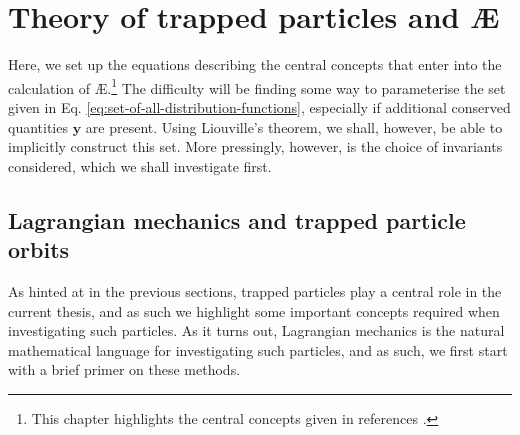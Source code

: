 \chapter[Theory]{Theory of trapped particles and \AE{}}
\label{chap: chapter 2}
Here, we set up the equations describing the central concepts that enter into the calculation of \AE{}.\footnote{This chapter highlights the central concepts given in references \cite{helander2005collisional,helander2014theory,helander2017available,helander2020available}.} The difficulty will be finding some way to parameterise the set given in Eq. \eqref{eq:set-of-all-distribution-functions}, especially if additional conserved quantities $\boldsymbol{y}$ are present. Using Liouville's theorem, we shall, however, be able to implicitly construct this set. More pressingly, however, is the choice of invariants considered, which we shall investigate first.


\section{Lagrangian mechanics and trapped particle orbits}
As hinted at in the previous sections, trapped particles play a central role in the current thesis, and as such we highlight some important concepts required when investigating such particles. As it turns out, Lagrangian mechanics is the natural mathematical language for investigating such particles, and as such, we first start with a brief primer on these methods.
